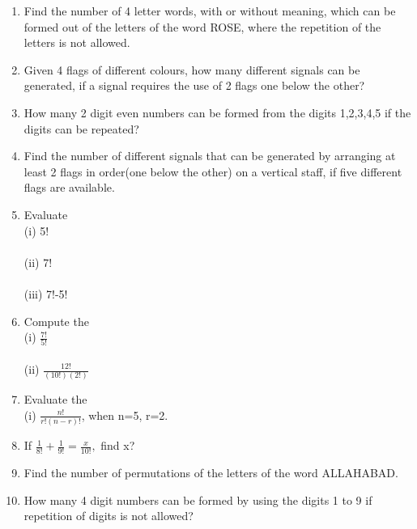 \renewcommand{\theequation}{\theenumi}
\begin{enumerate}[label=\arabic*.,ref=\thesubsection.\theenumi]
\item Find the number of 4 letter words, with or without meaning, which can be formed out of the letters of the word ROSE, where the repetition of the letters is not allowed.\\

\item Given 4 flags of different colours, how many different signals can be generated, if a signal requires the use of 2 flags one below the other?\\

\item How many 2 digit even numbers can be formed from the digits 1,2,3,4,5 if the digits can be repeated?\\

\item Find the number of different signals that can be generated by arranging at least 2 flags in order(one below the other) on a vertical staff, if five different flags are available.\\

\item Evaluate\\
(i) 5!\\
\\(ii) 7!\\
\\(iii) 7!-5!\\

\item Compute the\\
(i) $\frac{7!}{5!}$\\
\\(ii) $\frac{12!}{(10!)(2!)}$\\

\item Evaluate the\\
(i) $\frac{n!}{r!(n-r)!}$, when n=5, r=2.\\

\item If $\frac{1}{8!} + \frac{1}{9!} =\frac{x}{10!},$ find x?\\

\item Find the number of permutations of the letters of the word ALLAHABAD.\\

\item How many 4 digit numbers can be formed by using the digits 1 to 9 if repetition of digits is not allowed?\\


\end{enumerate}
